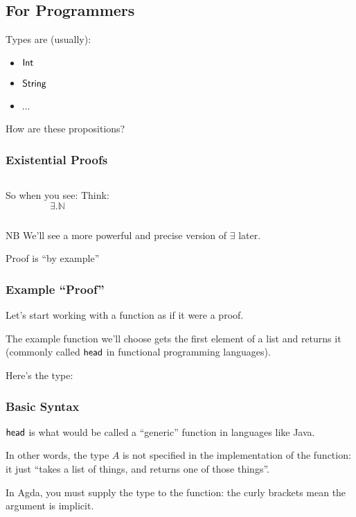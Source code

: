 \documentclass[draft,usenames,dvipsnames]{beamer}
\begin{document}
\subsection{For Programmers}
\begin{frame}
  Types are (usually):
  \begin{itemize}
    \item \(\AgdaDatatype{Int}\)
    \item \(\AgdaDatatype{String}\)
    \item ...
  \end{itemize}

  How are these propositions?
\end{frame}
\begin{frame}[fragile]
  \frametitle{Existential Proofs}
  \begin{columns}[T]
    \centering
    So when you see:
    \centering
    Think:
    \[\exists. \mathbb{N}\]
  \end{columns}

  \begin{block}{NB}
    We'll see a more powerful and precise version of \(\exists\) later.
  \end{block}

  Proof is ``by example''

\end{frame}
\begin{frame}[fragile]
  \frametitle{Example ``Proof''}
  Let's start working with a function as if it were a proof.

  The example function we'll choose gets the first element of a list and returns
  it (commonly called \(\AgdaFunction{head}\) in functional programming
  languages).

  Here's the type:
\end{frame}
\begin{frame}
  \frametitle{Basic Syntax}
  \(\AgdaFunction{head}\) is what would be called a ``generic'' function in
  languages like Java.

  In other words, the type \(A\) is not specified in the implementation of the
  function: it just ``takes a list of things, and returns one of those things''.

  In Agda, you must supply the type to the function: the curly brackets mean the
  argument is implicit.
\end{frame}
\end{document}
